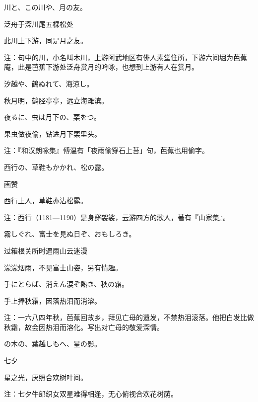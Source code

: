\begin{haiku}
    {\FH 川と、この川や、月の友。}

    {\FK 泛舟于深川尾五棵松处}

    {\FK 此川上下游，同是月之友。}

    {\FT 注：句中的川，小名叫木川，上游阿武地区有俳人素堂住所，下游六间堀为芭蕉庵，此是芭蕉下游处泛舟赏月的吟咏，也想到上游有人在赏月。}
\end{haiku}

\begin{haiku}
    {\FH 汐越や、鶴ぬれて、海涼し。}

    {\FK 秋月明，鹤胫亭亭，远立海滩滨。}
\end{haiku}

\begin{haiku}
    {\FH 夜るに、虫は月下の、栗をつ。}

    {\FK 果虫做夜偷，钻进月下栗里头。}

    {\FT 注：『和汉朗咏集』傅温有「夜雨偷穿石上苔」句，芭蕉也用偷字。}
\end{haiku}

\begin{haiku}
    {\FH 西行の、草鞋もかかれ、松の露。}

    {\FK 画赞}

    {\FK 西行上人，草鞋亦沾松露。}

    {\FT 注：西行（1181—1190）是身穿袈裟，云游四方的歌人，著有『山家集』。}
\end{haiku}

\begin{haiku}
    {\FH 霧しぐれ、富士を見ぬ日ぞ、おもしろき。}

    {\FK 过箱根关所时遇雨山云迷漫}

    {\FK 濛濛烟雨，不见富士山姿，另有情趣。}
\end{haiku}

\begin{haiku}
    {\FH 手にとらば、消えん涙ぞ熱き、秋の霜。}

    {\FK 手上捧秋霜，因落热泪而消溶。}

    {\FT 注：一六八四年秋，芭蕉回故乡，拜见亡母的遗发，不禁热泪滚落。他把白发比做秋霜，故会因热泪而溶化。写出对亡母的敬爱深情。}
\end{haiku}

\begin{haiku}
    {\FH {}の木の、葉越しもへ、星の影。}

    {\FK 七夕}

    {\FK 星之光，厌照合欢树叶间。}

    {\FT 注：七夕牛郎织女双星难得相逢，无心俯视合欢花树荫。}
\end{haiku}

